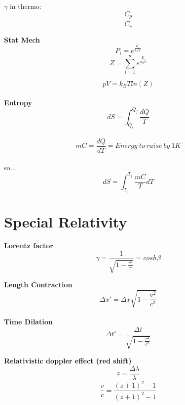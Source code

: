 \documentclass{article}
\begin{document}
$\gamma$ in thermo:\begin{equation}\frac{C_p}{C_v}\end{equation}

{\bf{Stat Mech}}\begin{equation}P_i = e^{\frac{E_i}{k_BT}}\end{equation}
\begin{equation}Z = {\sum \limits_{i = 1}^n} e^{\frac{E_i}{k_BT}}\end{equation}

\begin{equation}pV = k_BT ln(Z)\end{equation}
\\

{\bf{Entropy}}\begin{equation}dS = \int_{Q_i}^{Q_f} \frac{dQ}{T}\end{equation}
\\
\begin{equation}mC = \frac{dQ}{dT} =  Energy\ to\ raise\ by\ 1K\end{equation}
\\so...
\begin{equation}dS = \int_{T_i}^{T_f} \frac{mC}{T}dT\end{equation}








\section{Special Relativity}

{\bf{Lorentz factor}}\begin{equation} \gamma = \frac{1}{\sqrt{1-\frac{v^2}{c^2}}} = cosh \beta \end{equation}

{\bf{Length Contraction}}\begin{equation} \Delta x' = \Delta x \sqrt{1-\frac{v^2}{c^2}}\end{equation}
\\
{\bf{Time Dilation}}\begin{equation}\Delta t' = \frac{\Delta t}{\sqrt{1-\frac{v^2}{c^2}}}\end{equation}

{\bf{Relativistic doppler effect (red shift)}} \begin{equation}z = \frac{\Delta \lambda}{\lambda}\end{equation}
\begin{equation} \frac{v}{c} = \frac{(z+1)^2-1}{(z+1)^2-1}\end{equation}
\end{document}
